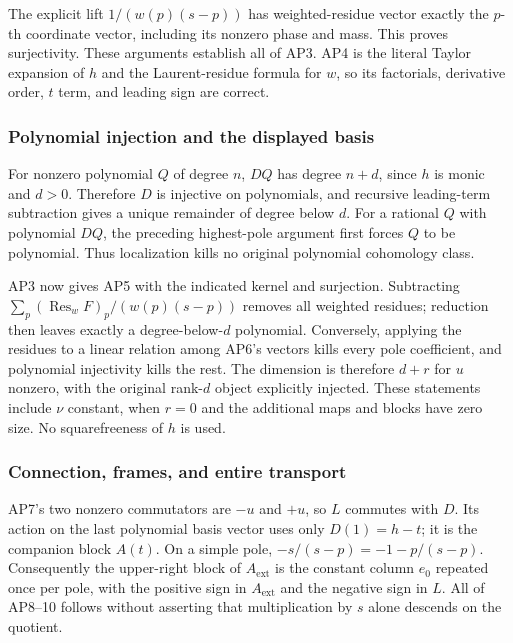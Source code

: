 The explicit lift \(1/(w(p)(s-p))\) has weighted-residue vector exactly the \(p\)-th coordinate vector, including its nonzero phase and mass. This proves surjectivity. These arguments establish all of AP3. AP4 is the literal Taylor expansion of \(h\) and the Laurent-residue formula for \(w\), so its factorials, derivative order, \(t\) term, and leading sign are correct.

\subsubsection{Polynomial injection and the displayed basis}\label{endpoint-analytic_pole_review--polynomial-injection-and-the-displayed-basis}

For nonzero polynomial \(Q\) of degree \(n\), \(DQ\) has degree \(n+d\), since \(h\) is monic and \(d>0\). Therefore \(D\) is injective on polynomials, and recursive leading-term subtraction gives a unique remainder of degree below \(d\). For a rational \(Q\) with polynomial \(DQ\), the preceding highest-pole argument first forces \(Q\) to be polynomial. Thus localization kills no original polynomial cohomology class.

AP3 now gives AP5 with the indicated kernel and surjection. Subtracting \(\sum_p(\operatorname{Res}_w F)_p/(w(p)(s-p))\) removes all weighted residues; reduction then leaves exactly a degree-below-\(d\) polynomial. Conversely, applying the residues to a linear relation among AP6's vectors kills every pole coefficient, and polynomial injectivity kills the rest. The dimension is therefore \(d+r\) for \(u\) nonzero, with the original rank-\(d\) object explicitly injected. These statements include \(\nu\) constant, when \(r=0\) and the additional maps and blocks have zero size. No squarefreeness of \(h\) is used.

\subsubsection{Connection, frames, and entire transport}\label{endpoint-analytic_pole_review--connection-frames-and-entire-transport}

AP7's two nonzero commutators are \(-u\) and \(+u\), so \(L\) commutes with \(D\). Its action on the last polynomial basis vector uses only \(D(1)=h-t\); it is the companion block \(A(t)\). On a simple pole, \(-s/(s-p)=-1-p/(s-p)\). Consequently the upper-right block of \(A_{\mathrm{ext}}\) is the constant column \(e_0\) repeated once per pole, with the positive sign in \(A_{\mathrm{ext}}\) and the negative sign in \(L\). All of AP8--10 follows without asserting that multiplication by \(s\) alone descends on the quotient.

